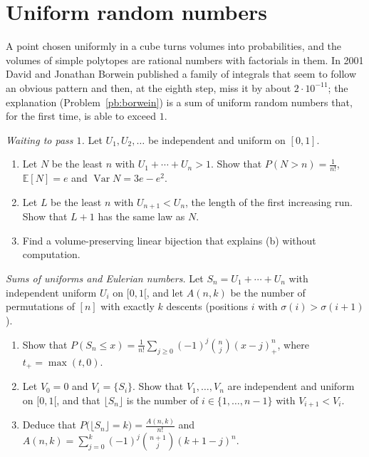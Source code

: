 \section{Uniform random numbers}

A point chosen uniformly in a cube turns volumes into probabilities, and the volumes of simple polytopes are rational numbers
with factorials in them. In 2001 David and Jonathan Borwein published a family of integrals that seem to follow an obvious pattern
and then, at the eighth step, miss it by about $2\cdot10^{-11}$; the explanation (Problem~\ref{pb:borwein}) is a sum of uniform
random numbers that, for the first time, is able to exceed $1$.

\begin{exercise}[$\star$]\label{pb:passone}
\emph{Waiting to pass $1$.} Let $U_1,U_2,\dots$ be independent and uniform on $[0,1]$.
\begin{enumerate}[label=(\alph*)]
\item Let $N$ be the least $n$ with $U_1+\cdots+U_n>1$. Show that $P(N>n)=\frac1{n!}$, $\mathbb E[N]=e$ and $\operatorname{Var}N=3e-e^2$.
\item Let $L$ be the least $n$ with $U_{n+1}<U_n$, the length of the first increasing run. Show that $L+1$ has the same law as $N$.
\item Find a volume-preserving linear bijection that explains (b) without computation.
\end{enumerate}
\end{exercise}

\begin{exercise}[$\star\star\star$]\label{pb:irwinhall}
\emph{Sums of uniforms and Eulerian numbers.} Let $S_n=U_1+\cdots+U_n$ with independent uniform $U_i$ on $[0,1[$, and let $A(n,k)$
be the number of permutations of $[n]$ with exactly $k$ descents (positions $i$ with $\sigma(i)>\sigma(i+1)$).
\begin{enumerate}[label=(\alph*)]
\item Show that $\displaystyle P(S_n\le x)=\frac1{n!}\sum_{j\ge0}(-1)^j\binom nj(x-j)_+^n$, where $t_+=\max(t,0)$.
\item Let $V_0=0$ and $V_i=\{S_i\}$. Show that $V_1,\dots,V_n$ are independent and uniform on $[0,1[$, and that $\lfloor S_n\rfloor$ is the
number of $i\in\{1,\dots,n-1\}$ with $V_{i+1}<V_i$.
\item Deduce that $P\bigl(\lfloor S_n\rfloor=k\bigr)=\frac{A(n,k)}{n!}$ and $\displaystyle A(n,k)=\sum_{j=0}^k(-1)^j\binom{n+1}j(k+1-j)^n$.
\end{enumerate}
\end{exercise}

